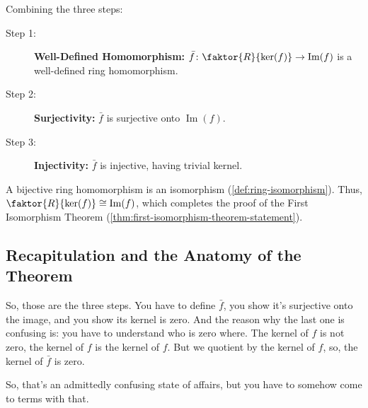 \begin{proofWrapper}
\begin{content}
\begin{steps}
Combining the three steps:
\begin{description}
    \item[Step 1:] \textbf{Well-Defined Homomorphism:} $\bar{f} \colon \faktor{R}{\ker(f)} \to \operatorname{Im}(f)$ is a well-defined ring homomorphism.
    \item[Step 2:] \textbf{Surjectivity:} $\bar{f}$ is surjective onto $\operatorname{Im}(f)$.
    \item[Step 3:] \textbf{Injectivity:} $\bar{f}$ is injective, having trivial kernel.
\end{description}
A bijective ring homomorphism is an isomorphism (\cref{def:ring-isomorphism}). Thus, $\faktor{R}{\ker(f)} \cong \operatorname{Im}(f)$, which completes the proof of the First Isomorphism Theorem (\cref{thm:first-isomorphism-theorem-statement}).
\end{steps}
\end{content}

\end{proofWrapper}

\subsection{Recapitulation and the Anatomy of the Theorem}

\begin{speech}[01:06:43 - 01:07:37]
So, those are the three steps. You have to define $\bar{f}$, you show it's surjective onto the image, and you show its kernel is zero. And the reason why the last one is confusing is: you have to understand who is zero where. The kernel of $f$ is not zero, the kernel of $f$ is the kernel of $f$. But we quotient by the kernel of $f$, so, the kernel of $\bar{f}$ is zero. 

So, that's an admittedly confusing state of affairs, but you have to somehow come to terms with that.
\end{speech}

